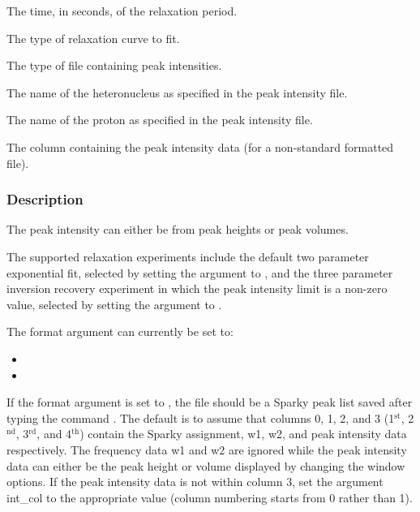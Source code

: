   The time, in seconds, of the relaxation period. 

  The type of relaxation curve to fit. 

  The type of file containing peak intensities. 

  The name of the heteronucleus as specified in the peak intensity file. 

  The name of the proton as specified in the peak intensity file. 

  The column containing the peak intensity data (for a non-standard formatted file). 




\subsubsection{Description}

The peak intensity can either be from peak heights or peak volumes.


The supported relaxation experiments include the default two parameter exponential fit, selected by setting the  argument to , and the three parameter inversion recovery experiment in which the peak intensity limit is a non-zero value, selected by setting the argument to .


The format argument can currently be set to:


\begin{itemize}
\item[]  
\item[]  
\end{itemize}


If the format argument is set to , the file should be a Sparky peak list saved after typing the command .  The default is to assume that columns 0, 1, 2, and 3 (1$^\mathrm{st}$, 2$^\mathrm{nd}$, 3$^\mathrm{rd}$, and 4$^\mathrm{th}$) contain the Sparky assignment, w1, w2, and peak intensity data respectively. The frequency data w1 and w2 are ignored while the peak intensity data can either be the peak height or volume displayed by changing the window options.  If the peak intensity data is not within column 3, set the argument int\_col to the appropriate value (column numbering starts from 0 rather than 1).


